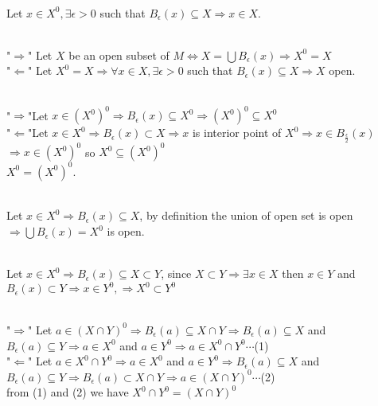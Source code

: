 \documentclass{amsbook}
\begin{document}
\begin{tcolorbox}[enhanced,attach boxed title to top 
center={yshift=-3mm,yshifttext=-1mm},
  colback=blue!5!white,colframe=blue!75!black,colbacktitle=red!80!black,
  title={Exercise 39.11:},fonttitle=\bfseries,
  boxed title style={size=small,colframe=red!50!black} ]
 {\color{red}{(a)-$X^0\subset X$ for $X\subset M$.}}\\
 Let $x\in X^0,\exists\epsilon>0$ such that $B_\epsilon(x)\subseteq X\Rightarrow 
 x\in X$.

  {\color{red}{(b)-$X$ is open $\iff X^0=X$.}}\\
"$\Rightarrow$" Let $X$ be an open subset of $M\iff X=\bigcup 
B_\epsilon(x)\Rightarrow X^0=X$\\
"$\Leftarrow$" Let $X^0=X\Rightarrow\forall x\in X,\exists\epsilon>0$ such that 
$B_\epsilon(x)\subseteq X\Rightarrow X$ open.

 {\color{red}{(c)-$(X^0)^0=X^0$.}}\\
"$\Rightarrow$"Let $x\in (X^0)^0\Rightarrow B_\epsilon(x)\subseteq X^0\Rightarrow 
(X^0)^0\subseteq X^0$\\
"$\Leftarrow$"Let $x\in X^0\Rightarrow B_\epsilon(x)\subset X\Rightarrow x$ is 
interior point of $X^0\Rightarrow x\in B_{\frac{\epsilon}{2}}(x)$\\
$\Rightarrow x\in (X^0)^0$ so $X^0\subseteq (X^0)^0$\\
$X^0=(X^0)^0$.

 {\color{red}{(d)-$X^0$ is open for all $X\in M$.}}\\
Let $x\in X^0\Rightarrow B_\epsilon(x)\subseteq X$, by definition the union of open 
set is open$\Rightarrow\bigcup B_\epsilon(x)=X^0$ is open.

{\color{red}{(e)- if $X\subset Y\subset M$ then $X^0\subset Y^0$, Proof:}}\\
Let $x\in X^0\Rightarrow B_\epsilon(x)\subseteq X\subset Y$, since  $X\subset 
Y\Rightarrow\exists x\in X$ then $x\in Y$ and $B_\epsilon(x)\subset Y\Rightarrow 
x\in Y^0,\Rightarrow X^0\subset Y^0$

{\color{red}{(f)-$X^0\cap Y^0=(X\cap Y)^0$.}}\\
"$\Rightarrow$" Let $a\in (X\cap Y)^0\Rightarrow B_\epsilon(a)\subseteq X\cap
Y\Rightarrow B_\epsilon(a)\subseteq X$ and $B_\epsilon(a)\subseteq Y\Rightarrow a\in
X^0$ and $a\in Y^0\Rightarrow a\in X^0\cap Y^0\cdots $(1)\\
"$\Leftarrow$" Let $a\in X^0\cap Y^0\Rightarrow a\in X^0$ and $a\in Y^0\Rightarrow 
B_\epsilon(a)\subseteq X$ and $B_\epsilon(a)\subseteq Y\Rightarrow 
B_\epsilon(a)\subset X\cap Y\Rightarrow a\in (X\cap Y)^0\cdots $(2)\\
from (1) and (2) we have $X^0\cap Y^0=(X\cap Y)^0$


\end{tcolorbox}
\end{document}
